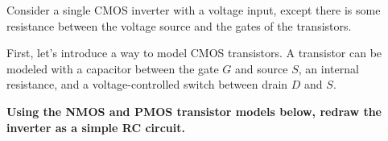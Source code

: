 

Consider a single CMOS inverter with a voltage input, except there is some resistance between the voltage source and the gates of the transistors.

\vspace{-1em}

\begin{center}
    
\end{center}

\vspace{-4em}

\begin{enumerate}

\qitem First, let's introduce a way to model CMOS transistors.
A transistor can be modeled with a capacitor between the gate $G$ and source $S$, an internal resistance, and a voltage-controlled switch between drain $D$ and $S$.

\textbf{Using the NMOS and PMOS transistor models below, redraw the inverter as a simple RC circuit.}


\end{enumerate}
